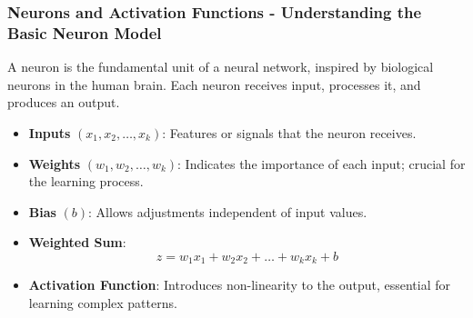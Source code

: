 \documentclass[aspectratio=169]{beamer}
\begin{document}
\begin{frame}[fragile]
    \frametitle{Neurons and Activation Functions - Understanding the Basic Neuron Model}
    A neuron is the fundamental unit of a neural network, inspired by biological neurons in the human brain. Each neuron receives input, processes it, and produces an output.

    \begin{itemize}
        \item \textbf{Inputs} $(x_1, x_2, \ldots, x_k)$: Features or signals that the neuron receives.
        \item \textbf{Weights} $(w_1, w_2, \ldots, w_k)$: Indicates the importance of each input; crucial for the learning process.
        \item \textbf{Bias} $(b)$: Allows adjustments independent of input values.
        \item \textbf{Weighted Sum}:
        \[
        z = w_1x_1 + w_2x_2 + \ldots + w_kx_k + b
        \]
        \item \textbf{Activation Function}: Introduces non-linearity to the output, essential for learning complex patterns.
    \end{itemize}
\end{frame}
\end{document}
